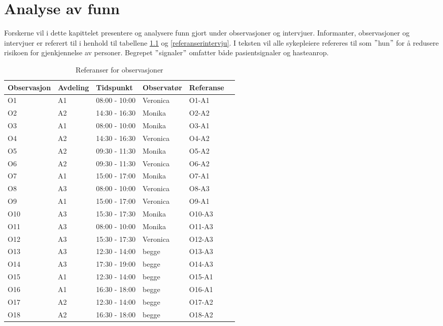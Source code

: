 \chapter{Analyse av funn}
\label{chp:analyseavfunn}
Forskerne vil i dette kapittelet presentere og analysere funn gjort under observasjoner og intervjuer. Informanter, observasjoner og intervjuer er referert til i henhold til tabellene \ref{referanserobservasjoner} og \ref{referanserintervju}. I teksten vil alle sykepleiere refereres til som $"$hun$"$ for å redusere risikoen for gjenkjennelse av personer. Begrepet $"$signaler$"$ omfatter både pasientsignaler og hasteanrop.

\begin{table}[H]\centering
    \begin{tabular}{ |l|l|l|l|l|l| }
    \hline
   \textbf{Observasjon} & \textbf{Avdeling} & \textbf{Tidspunkt} & \textbf{Observatør} & \textbf{Referanse}\\ \hline
       O1 & A1 & 08:00 - 10:00 & Veronica & O1-A1\\ \hline
       O2 & A2 & 14:30 - 16:30 & Monika & O2-A2 \\ \hline
      O3 & A1 & 08:00 - 10:00 & Monika & O3-A1 \\ \hline
       O4 & A2 & 14:30 - 16:30 & Veronica & O4-A2 \\ \hline
         O5 & A2 & 09:30 - 11:30 & Monika & O5-A2 \\ \hline
       O6 & A2 & 09:30 - 11:30 & Veronica & O6-A2 \\ \hline
      O7 & A1 & 15:00 - 17:00 & Monika & O7-A1 \\ \hline
       O8 & A3 & 08:00 - 10:00 & Veronica & O8-A3 \\ \hline
       O9 & A1 & 15:00 - 17:00 & Veronica & O9-A1 \\ \hline
       O10 & A3 & 15:30 - 17:30 & Monika & O10-A3 \\ \hline
      O11 & A3 & 08:00 - 10:00 & Monika & O11-A3 \\ \hline
       O12 & A3 & 15:30 - 17:30 & Veronica & O12-A3 \\ \hline
       O13 & A3 & 12:30 - 14:00 & begge & O13-A3 \\ \hline
       O14 & A3 & 17:30 - 19:00 & begge & O14-A3 \\ \hline
      O15 & A1 & 12:30 - 14:00 & begge & O15-A1 \\ \hline
       O16 & A1 & 16:30 - 18:00 & begge & O16-A1 \\ \hline
         O17 & A2 & 12:30 - 14:00 & begge & O17-A2 \\ \hline
       O18 & A2 & 16:30 - 18:00 & begge & O18-A2 \\ \hline
    \end{tabular}
    \caption {Referanser for observasjoner}
    \label{referanserobservasjoner}
\end{table}

